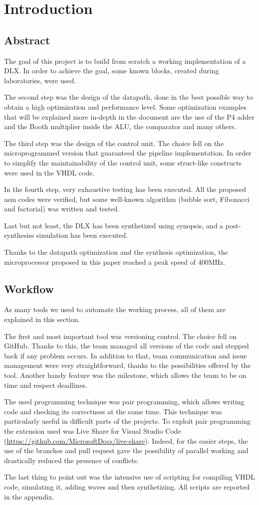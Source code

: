 \chapter{Introduction}

\section{Abstract}
The goal of this project is to build from scratch a working implementation of a DLX. In order to achieve the goal, some known blocks, created during laboratories, were used. 

The second step was the design of the datapath, done in the best possible way to obtain a high optimization and performance level. Some optimization examples that will be explained more in-depth in the document are the use of the P4 adder and the Booth multiplier inside the ALU, the comparator and many others. 

The third step was the design of the control unit. The choice fell on the microprogrammed version that guaranteed the pipeline implementation. In order to simplify the maintainability of the control unit, some struct-like constructs were used in the VHDL code. 

In the fourth step, very exhaustive testing has been executed. All the proposed asm codes were verified, but some well-known algorithm (bubble sort, Fibonacci and factorial) was written and tested.

Last but not least, the DLX has been synthetized using synopsis, and a post-synthesiss simulation has been executed. 

Thanks to the datapath optimization and the synthesis optimization, the microprocessor proposed in this paper reached a peak speed of 400MHz.  
\section{Workflow}
As many tools we used to automate the working process, all of them are explained in this section.

The first and most important tool was versioning control. The choice fell on GitHub. Thanks to this, the team managed all versions of the code and stepped back if any problem occurs. In addition to that, team communication and issue management were very straightforward, thanks to the possibilities offered by the tool. Another handy feature was the milestone, which allows the team to be on time and respect deadlines. 

The used programming technique was pair programming, which allows writing code and checking its correctness at the same time. This technique was particularly useful in difficult parts of the projects. To exploit pair programming the extension used was Live Share for Visual Studio Code (\url{https://github.com/MicrosoftDocs/live-share}). Indeed, for the easier steps, the use of the branches and pull request gave the possibility of parallel working and drastically reduced the presence of conflicts. 

The last thing to point out was the intensive use of scripting for compiling VHDL code, simulating it, adding waves and then synthetizing. All scripts are reported in the appendix.